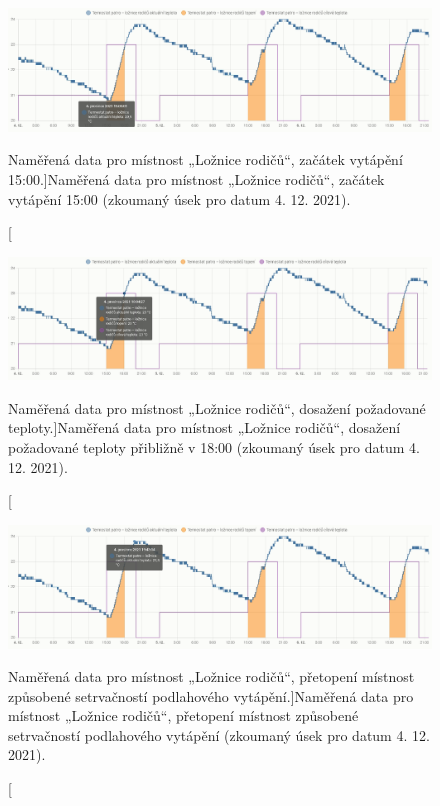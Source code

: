 \begin{figure}[H]
    \centering
    \includegraphics[width=\textwidth]{images/testovani/teplotni-plany/loznice-rodicu-termostat-zacatek-vytapeni.png}
    \caption[Naměřená data pro místnost „Ložnice rodičů“, začátek vytápění 15:00.]{Naměřená data pro místnost „Ložnice rodičů“, začátek vytápění 15:00 (zkoumaný úsek pro datum 4. 12. 2021).}
    \label{fig:loznice-rodicu-termostat-zacatek-vytapeni}
\end{figure}

\begin{figure}[H]
    \centering
    \includegraphics[width=\textwidth]{images/testovani/teplotni-plany/loznice-rodicu-termostat-konec-vytepeni.png}
    \caption[Naměřená data pro místnost „Ložnice rodičů“, dosažení požadované teploty.]{Naměřená data pro místnost „Ložnice rodičů“, dosažení požadované teploty přibližně v 18:00 (zkoumaný úsek pro datum 4. 12. 2021).}
    \label{fig:loznice-rodicu-termostat-konec-vytepeni}
\end{figure}

\begin{figure}[H]
    \centering
    \includegraphics[width=\textwidth]{images/testovani/teplotni-plany/loznice-rodicu-termostat-presazeni-teploty.png}
    \caption[Naměřená data pro místnost „Ložnice rodičů“, přetopení místnost způsobené setrvačností podlahového vytápění.]{Naměřená data pro místnost „Ložnice rodičů“, přetopení místnost způsobené setrvačností podlahového vytápění (zkoumaný úsek pro datum 4. 12. 2021).}
    \label{fig:loznice-rodicu-termostat-presazeni-teploty}
\end{figure}

